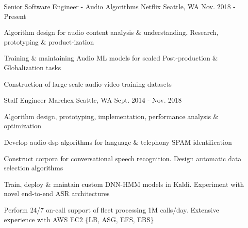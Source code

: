

\begin{cventries}

  \cventry
    {Senior Software Engineer - Audio Algorithms} %
    {Netflix} %
    {Seattle, WA} %
    {Nov. 2018 - Present} %
    {
      \begin{cvitems} %
        \item {Algorithm design for audio content analysis \& understanding. Research, prototyping \& product-ization}
        \item {Training \& maintaining Audio ML models for scaled Post-production \& Globalization tasks}
        \item {Construction of large-scale audio-video training datasets}
      \end{cvitems}
    }


  \cventry
    {Staff Engineer} %
    {Marchex} %
    {Seattle, WA} %
    {Sept. 2014 - Nov. 2018} %
    {
      \begin{cvitems} %
        \item {Algorithm design, prototyping, implementation, performance analysis \& optimization}
        \item {Develop audio-dsp algorithms for language \& telephony SPAM identification}
        \item {Construct corpora for conversational speech recognition. Design automatic data selection algorithms}
        \item {Train, deploy \& maintain custom DNN-HMM models in Kaldi. Experiment with novel end-to-end ASR architectures}
        \item {Perform 24/7 on-call support of fleet processing 1M calls/day. Extensive experience with AWS EC2 \{LB, ASG, EFS, EBS\}}
      \end{cvitems}
    }


\end{cventries}
